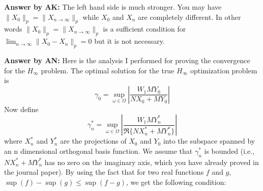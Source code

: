\documentclass[12pt]{article}
\begin{document}
{\bf Answer by AK:} The left hand side is much stronger. You may have $\|X_0\|_p = \|X_{n \to \infty}\|_p$ while  $X_0$ and $X_n$  are completely different. In other words $\|X_0\|_p = \|X_{n \to \infty}\|_p$ is a sufficient condition for $\lim_{n \to \infty} \|X_0 - X_n \|_p =0$ but it is not necessary.


{\bf Answer by AN:} Here is the analysis I performed for proving the convergence for the $H_\infty$ problem. The optimal solution for the true $H_\infty$ optimization problem is 
\begin{equation}
\gamma_0 = \sup_{\omega \in \Omega} \left \lvert \frac{W_1MY_0}{ NX_0 + MY_0} \right \rvert
\end{equation}
Now define 
\begin{equation} \label{convexopt}
\gamma_n^* = \sup_{\omega \in \Omega} \left \lvert \frac{W_1MY_n^*}{\Re\{ NX_n^* + MY_n^*\}} \right \rvert
\end{equation}
where $X_n^*$ and $Y_n^*$ are the projections of $X_0$ and $Y_0$ into the subspace spanned by an n dimensional orthogonal basis function. We assume that $\gamma_n^*$ is bounded (i.e., $NX_n^* + MY_n^*$ has no zero on the imaginary axis, which you have already proved in the journal paper). By using the fact that for two real functions $f$ and $g$, $\sup (f) - \sup (g) \leq \sup(f-g)$, we get the following condition:
\end{document}

